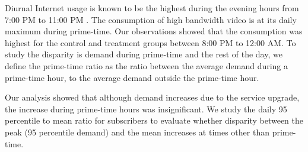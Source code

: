 Diurnal Internet usage is known to be the highest during the evening hours from 
7:00 PM to 11:00 PM \cite{fcc2015broadband-report}. The consumption of high 
bandwidth video is at its daily maximum during prime-time. Our observations 
showed that the consumption was highest for the control and treatment groups 
between 8:00 PM to 12:00 AM. To study the disparity is demand during prime-time 
and the rest of the day, we define the prime-time ratio as the ratio between 
the average demand during a prime-time hour, to the average demand outside the 
prime-time hour.

Our analysis showed that although demand increases due to the service upgrade, 
the increase during prime-time hours was insignificant. We study the daily 95 
percentile to mean ratio for subscribers to evaluate whether disparity between 
the peak (95 percentile demand) and the mean increases at times other than 
prime-time.







%